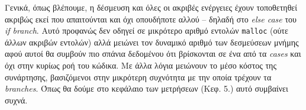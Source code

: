 Γενικά, όπως βλέπουμε, η δέσμευση και όλες οι ακριβές ενέργειες έχουν
τοποθετηθεί ακριβώς εκεί που απαιτούνται και όχι οπουδήποτε αλλού – δηλαδή στο
\textit{else case} του \textit{if branch}. Αυτό προφανώς δεν οδηγεί σε μικρότερο
αριθμό εντολών \texttt{malloc} (ούτε άλλων ακριβών εντολών) αλλά μειώνει τον
δυναμικό αριθμό των δεσμεύσεων μνήμης αφού αυτοί θα συμβούν πιο σπάνια δεδομένου
ότι βρίσκονται σε ένα από τα \textit{cases} και όχι στην κυρίως ροή του κώδικα.
Με άλλα λόγια μειώνουν το μέσο κόστος της συνάρτησης, βασιζόμενοι στην μικρότερη
συχνότητα με την οποία τρέχουν τα \textit{branches}. Όπως θα δούμε στο κεφάλαιο
των μετρήσεων (Κεφ. 5.) αυτό συμβαίνει συχνά.
